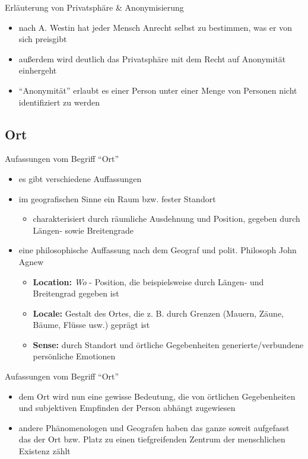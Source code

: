 \begin{frame}{Erläuterung von Privatsphäre \& Anonymisierung}
\begin{itemize}
  \item nach A. Westin hat jeder Mensch Anrecht selbst zu bestimmen, was er von sich preisgibt
  \item außerdem wird deutlich das Privatsphäre mit dem Recht auf Anonymität einhergeht
  \item "`Anonymität"' erlaubt es einer Person unter einer Menge von Personen nicht identifiziert zu werden
\end{itemize}
\end{frame}

\subsection*{Ort}
\begin{frame}{Aufassungen vom Begriff "`Ort"'}
\begin{itemize}
  \item es gibt verschiedene Auffassungen
  \item im geografischen Sinne ein Raum bzw. fester Standort
  \begin{itemize}
    \item charakterisiert durch räumliche Ausdehnung und Position, gegeben durch Längen- sowie Breitengrade
  \end{itemize}
  \item eine philosophische Auffassung nach dem Geograf und polit. Philosoph John Agnew
  \begin{itemize}
    \item \textbf{Location:} \textit{Wo} - Position, die beispielsweise durch Längen- und Breitengrad gegeben ist
    \item \textbf{Locale:} Gestalt des Ortes, die z. B. durch Grenzen (Mauern, Zäune, Bäume, Flüsse usw.) geprägt ist
    \item \textbf{Sense:} durch Standort und örtliche Gegebenheiten generierte/verbundene persönliche Emotionen
  \end{itemize}
\end{itemize}
\end{frame}

\begin{frame}{Aufassungen vom Begriff "`Ort"'}
\begin{itemize}
  \item dem Ort wird nun eine gewisse Bedeutung, die von örtlichen Gegebenheiten und subjektiven Empfinden der Person abhängt zugewiesen
  \item andere Phänomenologen und Geografen haben das ganze soweit aufgefasst das der Ort bzw. Platz zu einen tiefgreifenden Zentrum der menschlichen Existenz zählt
\end{itemize}
\end{frame}

